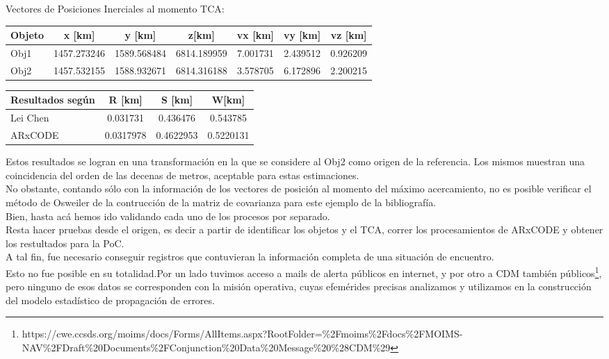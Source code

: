 Vectores de Posiciones Inerciales al momento TCA:\\
\begin{table}[!h]
\begin{tabular}{l|c|c|c|c|c|c}
\hline
Objeto & x [km] & y [km] &z[km] &vx [km] &vy [km] &vz [km]\\
\hline
Obj1 & 1457.273246 &1589.568484&6814.189959&7.001731&2.439512&0.926209\\
\hline
Obj2 & 1457.532155&1588.932671&6814.316188&3.578705&6.172896&2.200215\\
\hline
\end{tabular}
\end{table}

\begin{table}[!h]
\large
 \centering
\begin{tabular}{|l|c|c|c|}
\hline
Resultados seg\'un & R [km] & S [km] & W[km] \\
\hline
Lei Chen & 0.031731& 0.436476&0.543785\\
\hline
ARxCODE & 0.0317978& 0.4622953 &0.5220131
\\
\hline
\end{tabular}
\end{table}

Estos resultados se logran en una transformaci\'on en la que se considere al Obj2 como origen de la referencia. Los mismos muestran una coincidencia del orden de las decenas de metros, aceptable para estas estimaciones.\\
No obstante, contando s\'olo con la informaci\'on de los vectores de posici\'on al momento del m\'aximo acercamiento, no es posible verificar el m\'etodo de Osweiler de la contrucci\'on de la matriz de covarianza para este ejemplo de la bibliograf\'ia.\\

Bien, hasta ac\'a hemos ido validando cada uno de los procesos por separado.\\
Resta hacer pruebas desde el origen, es decir a partir de identificar los objetos y el TCA, correr los procesamientos de ARxCODE y obtener los restultados para la PoC.\\
A tal fin, fue necesario conseguir registros que contuvieran la informaci\'on completa de una situaci\'on de encuentro.\\
Esto no fue posible en su totalidad.Por un lado tuvimos acceso a mails de alerta p\'ublicos en internet, y por otro a CDM tambi\'en p\'ublicos\footnote{https://cwe.ccsds.org/moims/docs/Forms/AllItems.aspx?RootFolder=\%2Fmoims\%2Fdocs\%2FMOIMS-NAV\%2FDraft\%20Documents\%2FConjunction\%20Data\%20Message\%20\%28CDM\%29}, pero ninguno de esos datos se corresponden con la misi\'on operativa, cuyas efem\'erides precisas analizamos y utilizamos en la construcci\'on del modelo estad\'istico de propagaci\'on de errores.\\

